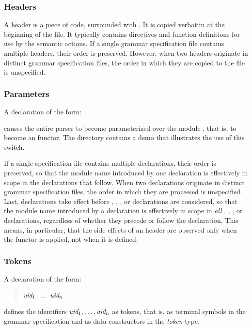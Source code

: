 \documentclass[onecolumn,11pt,nocopyrightspace,preprint]{sigplanconf}
\begin{document}
\subsubsection{Headers}
\label{sec:decls:headers}

A header is a piece of \ocaml code, surrounded with . It is
copied verbatim at the beginning of the \ml file. It typically contains \ocaml
{} directives and function definitions for use by the semantic
actions. If a single grammar specification file contains multiple headers,
their order is preserved. However, when two headers originate in distinct
grammar specification files, the order in which they are copied to the \ml
file is unspecified.

\subsubsection{Parameters}
\label{sec:parameter}

A declaration of the form:
\begin{quote}
\dparameter \ocamlparam
\end{quote}
causes the entire parser to become parameterized over the \ocaml module
, that is, to become an \ocaml functor. The directory
 contains a demo that illustrates the use of this switch.

If a single specification file
contains multiple \dparameter declarations, their order is preserved, so that
the module name  introduced by one declaration is effectively in scope
in the declarations that follow. When two \dparameter declarations originate
in distinct grammar specification files, the order in which they are processed
is unspecified. Last, \dparameter declarations take effect before \dheader{$\ldots$},
\dtoken, \dtype, or \dstart declarations are considered, so that the module name
 introduced by a \dparameter declaration is effectively in scope in
\emph{all} \dheader{$\ldots$}, \dtoken, \dtype, or \dstart declarations,
regardless of whether they precede or follow the \dparameter declaration.
This means, in particular, that the side effects of an \ocaml header are
observed only when the functor is applied, not when it is defined.

\subsubsection{Tokens}
\label{sec:tokens}

A declaration of the form:
\begin{quote}
\dtoken
\optional{\ocamltype}
$\textit{uid}_1$  $\;\ldots\;$
$\textit{uid}_n$ 
\end{quote}
defines the identifiers $\textit{uid}_1, \ldots, \textit{uid}_n$ as tokens, that is,
as terminal symbols in the grammar specification and as data constructors in
the \textit{token} type.
\end{document}
